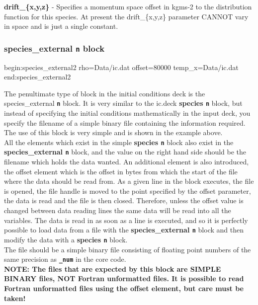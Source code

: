\documentclass[12pt,a4paper]{article}
\newcommand{\emphtext}{\color{warwickdark} \fontfamily{phv}\selectfont\Large\bf}
\newcommand{\inlinecode}[1]{{\color{warwickred} \bf\texttt{#1}}}
\newcommand{\inlineemph}[1]{{\color{warwicklight} \bf{#1}}}
\newcommand{\EPOCH}{{\color{warwickdark}\fontfamily{phv}\selectfont{EPOCH}}}
\newenvironment{lboxverbatim}[1]{
\setlength{\FrameSep}{0pt}
\def\FrameCommand{\fboxsep=0pt \colorbox{shadecolor}}
\MakeFramed{\FrameRestore}
\vspace{-13.5pt}
\fvset{label=#1}
\boxverb
}{
\endboxverb
\vspace{-13.5pt}
\endMakeFramed
}
\begin{document}
{\emphtext drift\_\{x,y,z\}} - Specifies a momentum space offset in kgms-2 to
the distribution function for this species. At present the drift\_\{x,y,z\}
parameter CANNOT vary in space and is just a single constant.

\subsubsection{\inlineemph{species\_external\inlinecode{n}} block}
\begin{lboxverbatim}{species\_external{\it n} block}
begin:species_external2
   rho=Data/ic.dat
   offset=80000
   temp_x=Data/ic.dat
end:species_external2
\end{lboxverbatim}

The penultimate type of block in the initial conditions deck is the
species\_external\inlinecode{n} block. It is very similar to the ic.deck
\inlineemph{species\inlinecode{n}} block, but instead of specifying the
initial conditions mathematically in the input deck, you specify the filename
of a simple binary file containing the information required. The use of this
block is very simple and is shown in the example above.\\

All the elements which exist in the simple \inlineemph{species\inlinecode{n}}
block also exist in the \inlineemph{species\_external\inlinecode{n}} block,
and the value on the right hand side should be the filename which holds the
data wanted. An additional element is also introduced, the offset element which
is the offset in bytes from which the start of the file where the data should
be read from. As a given line in the block executes, the file is opened, the
file handle is moved to the point specified by the offset parameter, the data
is read and the file is then closed. Therefore, unless the offset value is
changed between data reading lines the same data will be read into all the
variables. The data is read in as soon as a line is executed, and so it is
perfectly possible to load data from a file with the
\inlineemph{species\_external\inlinecode{n}} block and then modify the data
with a \inlineemph{species\inlinecode{n}} block.\\

The file should be a simple binary file consisting of floating point numbers of
the same precision as \inlinecode{\_num} in the core {\EPOCH} code.\\

{\emphtext NOTE: The files that are expected by this block are SIMPLE BINARY
files, NOT Fortran unformatted files. It is possible to read Fortran
unformatted files using the offset element, but care must be taken!}\\
\end{document}
